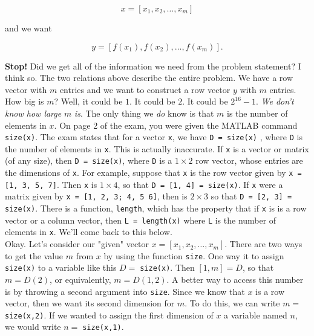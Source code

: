 \documentclass{article}
\begin{document}
\[
x = [x_1, x_2, \dots, x_m]
\]

{\setlength{\parindent}{0cm}
and we want}

\[
y = [f(x_1), f(x_2), \dots, f(x_m)].
\] 

\textbf{Stop!} Did we get all of the information we need from the problem statement? I think so. The two relations above describe the entire problem. We have a row vector with $m$ entries and we want to construct a row vector $y$ with $m$ entries. \\ 

How big is $m$? Well, it could be $1$. It could be $2$. It could be $2^{16}-1$. \textit{We don't know how large} $m$ \textit{is}. The only thing we \textit{do} know is that $m$ is the number of elements in $x$. On page 2 of the exam, you were given the MATLAB command \texttt{size(x)}. The exam states that for a vector \texttt{x}, we have \texttt{D = size(x)} , where \texttt{D} is the number of elements in \texttt{x}. This is actually inaccurate. If \texttt{x} is a vector or matrix (of any size), then \texttt{D = size(x)}, where \texttt{D} is a $1 \times 2$ row vector, whose entries are the dimensions of \texttt{x}. For example, suppose that \texttt{x} is the row vector given by \texttt{x = [1, 3, 5, 7]}. Then \texttt{x} is $1 \times 4$, so that \texttt{D = [1, 4] = size(x)}. If \texttt{x} were a matrix given by \texttt{x = [1, 2, 3; 4, 5 6]}, then  is $2 \times 3$ so that \texttt{D = [2, 3] = size(x)}. There is a function, \texttt{length}, which has the property that if \texttt{x} is is a row vector or a column vector, then \texttt{L = length(x)} where \texttt{L} is the number of elements in \texttt{x}. We'll come back to this below. \\

 Okay. Let's consider our "given" vector $x = [x_1, x_2, \dots, x_m]$. There are two ways to get the value $m$ from $x$ by using the function \texttt{size}. One way it to assign \texttt{size(x)} to a variable like this $D = \;$\texttt{size(x)}. Then $[1, m] = D$, so that $m = D(2)$, or equivalently, $m = D(1,2)$. A better way to access this number is by throwing a second argument into \texttt{size}. Since we know that $x$ is a row vector, then we want its second dimension for $m$. To do this, we can write $m = \;$\texttt{size(x,2)}. If we wanted to assign the first dimension of $x$ a variable named $n$, we would write $n = \;$\texttt{size(x,1)}.\\
\end{document}
